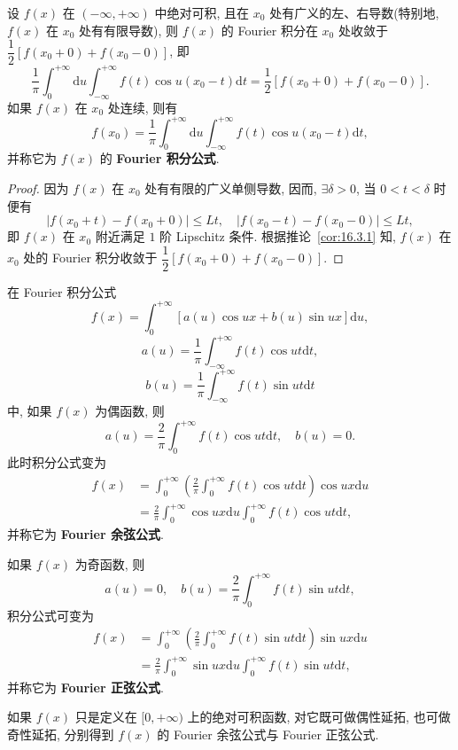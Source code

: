 \begin{corollary}\label{cor:16.3.2}
设 $f(x)$ 在 $(-\infty,+\infty)$ 中绝对可积, 且在 $x_{0}$ 处有广义的左、右导数(特别地, $f(x)$ 在 $x_{0}$ 处有有限导数), 则 $f(x)$ 的 Fourier 积分在 $x_{0}$ 处收敛于 $\dfrac{1}{2}[f(x_{0}+0)+f(x_{0}-0)]$, 即
\[
  \frac{1}{\pi}\int_{0}^{+\infty}\mathrm{d}u\int_{-\infty}^{+\infty}f(t)\cos u(x_{0}-t)\mathrm{d}t=\frac{1}{2}\left[f(x_{0}+0)+f(x_{0}-0)\right].
\]
如果 $f(x)$ 在 $x_{0}$ 处连续, 则有
\[
  f(x_{0})=\frac{1}{\pi}\int_{0}^{+\infty}\mathrm{d}u\int_{-\infty}^{+\infty}f(t)\cos u(x_{0}-t)\mathrm{d}t,
\]
并称它为 $f(x)$ 的 \textbf{Fourier 积分公式}.
\end{corollary}

\begin{proof}
因为 $f(x)$ 在 $x_{0}$ 处有有限的广义单侧导数, 因而, $\exists\delta>0$, 当 $0<t<\delta$ 时便有
\[
  |f(x_{0}+t)-f(x_{0}+0)|\leqslant Lt,\quad|f(x_{0}-t)-f(x_{0}-0)|\leqslant Lt,
\]
即 $f(x)$ 在 $x_{0}$ 附近满足 $1$ 阶 Lipschitz 条件. 根据推论~\ref{cor:16.3.1} 知, $f(x)$ 在 $x_{0}$ 处的 Fourier 积分收敛于 $\dfrac{1}{2}[f(x_{0}+0)+f(x_{0}-0)]$.
\end{proof}

在 Fourier 积分公式
\[
  f(x)=\int_{0}^{+\infty}[a(u)\cos ux+b(u)\sin ux]\mathrm{d}u,
\]
\[
  a(u)=\frac{1}{\pi}\int_{-\infty}^{+\infty}f(t)\cos ut\mathrm{d}t,
\]
\[
  b(u)=\frac{1}{\pi}\int_{-\infty}^{+\infty}f(t)\sin ut\mathrm{d}t
\]
中, 如果 $f(x)$ 为偶函数, 则
\[
  a(u)=\frac{2}{\pi}\int_{0}^{+\infty}f(t)\cos ut\mathrm{d}t,\quad b(u)=0.
\]
此时积分公式变为
\begin{align*}
  f(x)&=\int_{0}^{+\infty}\left(\frac{2}{\pi}\int_{0}^{+\infty}f(t)\cos ut\mathrm{d}t\right)\cos ux\mathrm{d}u\\
  &=\frac{2}{\pi}\int_{0}^{+\infty}\cos ux\mathrm{d}u\int_{0}^{+\infty}f(t)\cos ut\mathrm{d}t,
\end{align*}
并称它为 \textbf{Fourier 余弦公式}.

如果 $f(x)$ 为奇函数, 则
\[
  a(u)=0,\quad b(u)=\frac{2}{\pi}\int_{0}^{+\infty}f(t)\sin ut\mathrm{d}t,
\]
积分公式可变为
\begin{align*}
  f(x)&=\int_{0}^{+\infty}\left(\frac{2}{\pi}\int_{0}^{+\infty}f(t)\sin ut\mathrm{d}t\right)\sin ux\mathrm{d}u\\
  &=\frac{2}{\pi}\int_{0}^{+\infty}\sin ux\mathrm{d}u\int_{0}^{+\infty}f(t)\sin ut\mathrm{d}t,
\end{align*}
并称它为 \textbf{Fourier 正弦公式}.

如果 $f(x)$ 只是定义在 $[0,+\infty)$ 上的绝对可积函数, 对它既可做偶性延拓, 也可做奇性延拓, 分别得到 $f(x)$ 的 Fourier 余弦公式与 Fourier 正弦公式.

